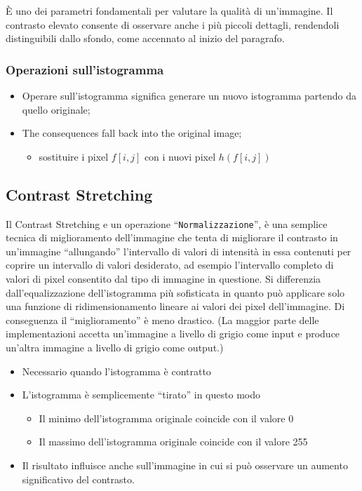 \documentclass{report}
\begin{document}
È uno dei parametri fondamentali per valutare la qualità di un'immagine.
Il contrasto elevato consente di osservare anche i più piccoli dettagli,
rendendoli distinguibili dallo sfondo, come accennato al inizio del
paragrafo.

\subsubsection{Operazioni sull'istogramma}
\label{sec:op-isto-cont}
\begin{itemize}
\item Operare sull'istogramma significa generare un nuovo istogramma partendo da quello originale;
\item The consequences fall back into the original image;
  \begin{itemize}
  \item sostituire i pixel $f[i,j]$ con i nuovi pixel $h(f[i,j])$
  \end{itemize}
\end{itemize}

\subsection{Contrast Stretching}
\label{sec:contrStrect}

Il Contrast Stretching e un operazione ``\texttt{Normalizzazione}'', è una
semplice tecnica di miglioramento dell'immagine che tenta di migliorare
il contrasto in un'immagine ``allungando'' l'intervallo di valori di
intensità in essa contenuti per coprire un intervallo di valori
desiderato, ad esempio l'intervallo completo di valori di pixel
consentito dal tipo di immagine in questione. Si differenzia
dall'equalizzazione dell'istogramma più sofisticata in quanto può
applicare solo una funzione di ridimensionamento lineare ai valori dei
pixel dell'immagine. Di conseguenza il ``miglioramento'' è meno drastico.
(La maggior parte delle implementazioni accetta un'immagine a livello di
grigio come input e produce un'altra immagine a livello di grigio come
output.)
\begin{itemize}
\item Necessario quando l'istogramma è contratto
\item L'istogramma è semplicemente ``tirato'' in questo modo
  \begin{itemize}
  \item Il minimo dell'istogramma originale coincide con il valore 0
  \item Il massimo dell'istogramma originale coincide con il valore 255
  \end{itemize}
\item Il risultato influisce anche sull'immagine in cui si può osservare
  un aumento significativo del contrasto.
\end{itemize}
\end{document}
